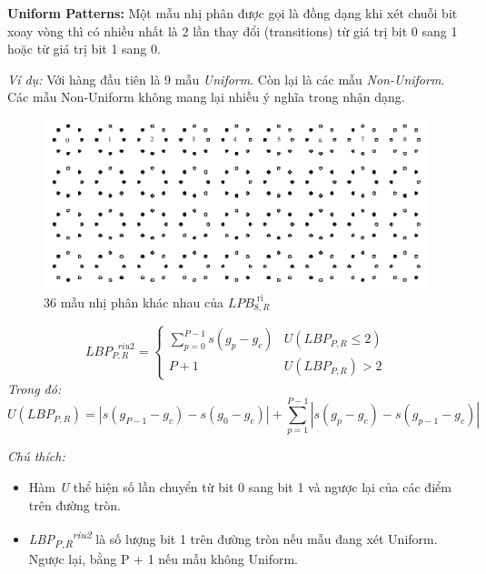 \textbf{Uniform Patterns:} Một mẫu nhị phân được gọi là đồng dạng khi xét chuỗi bit xoay vòng thì có nhiều nhất là 2 lần thay đổi (transitions) từ giá trị bit 0 sang 1 hoặc từ giá trị bit 1 sang 0. 

\textit{Ví dụ: }Với hàng đầu tiên là 9 mẫu \textit{Uniform}. Còn lại là các mẫu \textit{Non-Uniform}. Các mẫu Non-Uniform không mang lại nhiều ý nghĩa trong nhận dạng.
\begin{figure}[H]
	\begin{center}
		\includegraphics[scale=0.4]{images/theo1/uniform_exam}
		\caption{36 mẫu nhị phân khác nhau của $LPB_{8,R}^{\text{  ri}}$}
	\end{center}
\end{figure}

\begin{equation}
	LBP_{P,R}^{\text{  }riu2}=\begin{cases}
		\sum_{p=0}^{P-1}{s(g_p-g_c)}  & U(LBP_{P,R}\leq 2)\\
		P + 1 & U(LBP_{P,R}) > 2
	\end{cases}
\end{equation}
\textit{Trong đó:}
$$
	U(LBP_{P,R})=\left\lvert s(g_{P-1} - g_c)-s(g_0-g_c)\right\rvert + \sum_{p=1}^{P-1}{\left\lvert s(g_p - g_c)-s(g_{p-1}-g_c)\right\rvert}
$$

\textit{Chú thích:} 
\begin{itemize}
	\item Hàm \textit{U} thể hiện số lần chuyển từ bit 0 sang bit 1 và ngược lại của các điểm trên đường tròn.
	\item \textit{LBP\textsubscript{P,R}\textsuperscript{riu2}} là số lượng bit 1 trên đường tròn nếu mẫu đang xét Uniform. Ngược lại, bằng P + 1 nếu mẫu không Uniform.
\end{itemize}
\pagebreak

